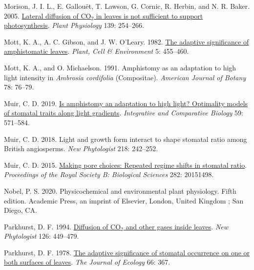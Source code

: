 \documentclass[
  letterpaper,
  DIV=11,
  numbers=noendperiod]{scrartcl}
\newlength{\cslhangindent}
\newlength{\cslentryspacingunit} %
\newenvironment{CSLReferences}[2] %
 {%
  \setlength{\parindent}{0pt}
  \ifodd #1
  \let\oldpar\par
  \def\par{\hangindent=\cslhangindent\oldpar}
  \fi
  \setlength{\parskip}{#2\cslentryspacingunit}
 }%
 {}
\begin{document}
\begin{CSLReferences}{1}{0}
\leavevmode{}%
Morison, J. I. L., E. Gallouët, T. Lawson, G. Cornic, R. Herbin, and N.
R. Baker. 2005. \href{https://doi.org/10.1104/pp.105.062950}{Lateral
diffusion of {CO}\(_{\textrm{2}}\) in leaves is not sufficient to
support photosynthesis}. \emph{Plant Physiology} 139: 254--266.

\leavevmode{}%
Mott, K. A., A. C. Gibson, and J. W. O'Leary. 1982.
\href{https://doi.org/10.1111/1365-3040.ep11611750}{The adaptive
significance of amphistomatic leaves}. \emph{Plant, Cell \& Environment}
5: 455--460.

\leavevmode{}%
Mott, K. A., and O. Michaelson. 1991. Amphistomy as an adaptation to
high light intensity in \emph{{Ambrosia} cordifolia} ({Compositae}).
\emph{American Journal of Botany} 78: 76--79.

\leavevmode{}%
Muir, C. D. 2019. \href{https://doi.org/10.1093/icb/icz085}{Is
amphistomy an adaptation to high light? {Optimality} models of stomatal
traits along light gradients}. \emph{Integrative and Comparative
Biology} 59: 571--584.

\leavevmode{}%
Muir, C. D. 2018. Light and growth form interact to shape stomatal ratio
among {British} angiosperms. \emph{New Phytologist} 218: 242--252.

\leavevmode{}%
Muir, C. D. 2015. \href{https://doi.org/10.1098/rspb.2015.1498}{Making
pore choices: Repeated regime shifts in stomatal ratio}.
\emph{Proceedings of the Royal Society B: Biological Sciences} 282:
20151498.

\leavevmode{}%
Nobel, P. S. 2020. Physicochemical and environmental plant physiology.
Fifth edition. Academic Press, an imprint of Elsevier, London, United
Kingdom ; San Diego, CA.

\leavevmode{}%
Parkhurst, D. F. 1994.
\href{http://www.jstor.org/stable/2557929}{Diffusion of
{CO}\(_{\textrm{2}}\) and other gases inside leaves}. \emph{New
Phytologist} 126: 449--479.

\leavevmode{}%
Parkhurst, D. F. 1978. \href{https://doi.org/10.2307/2259142}{The
adaptive significance of stomatal occurrence on one or both surfaces of
leaves}. \emph{The Journal of Ecology} 66: 367.


\end{CSLReferences}
\end{document}
